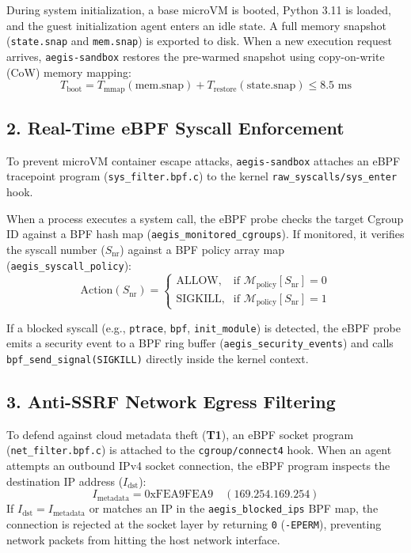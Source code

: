 \documentclass[11pt,a4paper]{article}
\begin{document}
During system initialization, a base microVM is booted, Python 3.11 is loaded, and the guest initialization agent enters an idle state. A full memory snapshot (\texttt{state.snap} and \texttt{mem.snap}) is exported to disk. When a new execution request arrives, \texttt{aegis-sandbox} restores the pre-warmed snapshot using copy-on-write (CoW) memory mapping:
\begin{equation}
T_{\text{boot}} = T_{\text{mmap}}(\text{mem.snap}) + T_{\text{restore}}(\text{state.snap}) \le 8.5\text{ ms}
\end{equation}

\subsection{2. Real-Time eBPF Syscall Enforcement}
To prevent microVM container escape attacks, \texttt{aegis-sandbox} attaches an eBPF tracepoint program (\texttt{sys\_filter.bpf.c}) to the kernel \texttt{raw\_syscalls/sys\_enter} hook. 

When a process executes a system call, the eBPF probe checks the target Cgroup ID against a BPF hash map (\texttt{aegis\_monitored\_cgroups}). If monitored, it verifies the syscall number ($S_{\text{nr}}$) against a BPF policy array map (\texttt{aegis\_syscall\_policy}):
\begin{equation}
\text{Action}(S_{\text{nr}}) = 
\begin{cases} 
\text{ALLOW}, & \text{if } \mathcal{M}_{\text{policy}}[S_{\text{nr}}] = 0 \\
\text{SIGKILL}, & \text{if } \mathcal{M}_{\text{policy}}[S_{\text{nr}}] = 1
\end{cases}
\end{equation}

If a blocked syscall (e.g., \texttt{ptrace}, \texttt{bpf}, \texttt{init\_module}) is detected, the eBPF probe emits a security event to a BPF ring buffer (\texttt{aegis\_security\_events}) and calls \texttt{bpf\_send\_signal(SIGKILL)} directly inside the kernel context.

\subsection{3. Anti-SSRF Network Egress Filtering}
To defend against cloud metadata theft (\textbf{T1}), an eBPF socket program (\texttt{net\_filter.bpf.c}) is attached to the \texttt{cgroup/connect4} hook. When an agent attempts an outbound IPv4 socket connection, the eBPF program inspects the destination IP address ($I_{\text{dst}}$):
\begin{equation}
I_{\text{metadata}} = \text{0xFEA9FEA9} \quad (169.254.169.254)
\end{equation}
If $I_{\text{dst}} = I_{\text{metadata}}$ or matches an IP in the \texttt{aegis\_blocked\_ips} BPF map, the connection is rejected at the socket layer by returning \texttt{0} (\texttt{-EPERM}), preventing network packets from hitting the host network interface.
\end{document}
